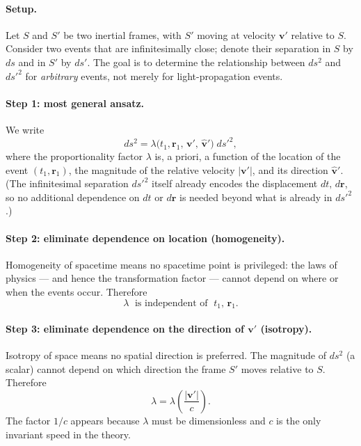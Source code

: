 \paragraph{Setup.}
Let $S$ and $S'$ be two inertial frames, with $S'$ moving at velocity
$\mathbf{v}'$ relative to $S$.  Consider two events that are
infinitesimally close; denote their separation in $S$ by $ds$ and in
$S'$ by $ds'$.  The goal is to determine the relationship between
$ds^2$ and $ds'^2$ for \emph{arbitrary} events, not merely for
light-propagation events.

\paragraph{Step 1: most general ansatz.}
We write
\begin{equation}
  ds^2 = \lambda\bigl(t_1, \mathbf{r}_1,\,\mathbf{v}',\,
         \widehat{\mathbf{v}}'\bigr)\;ds'^2,
  \label{eq:lec02:ansatz0}
\end{equation}
where the proportionality factor $\lambda$ is, a priori, a function
of the location of the event $(t_1,\mathbf{r}_1)$, the magnitude of
the relative velocity $|\mathbf{v}'|$, and its direction
$\widehat{\mathbf{v}}'$.  (The infinitesimal separation $ds'^2$
itself already encodes the displacement $dt,\,d\mathbf{r}$, so no
additional dependence on $dt$ or $d\mathbf{r}$ is needed beyond
what is already in $ds'^2$.)

\paragraph{Step 2: eliminate dependence on location (homogeneity).}
Homogeneity of spacetime means no spacetime point is privileged:
the laws of physics — and hence the transformation factor — cannot
depend on where or when the events occur.  Therefore
\begin{equation}
  \lambda \;\text{ is independent of }\; t_1,\,\mathbf{r}_1.
  \label{eq:lec02:drop_r1}
\end{equation}

\paragraph{Step 3: eliminate dependence on the direction of $\mathbf{v}'$
(isotropy).}
Isotropy of space means no spatial direction is preferred.  The
magnitude of $ds^2$ (a scalar) cannot depend on which direction the
frame $S'$ moves relative to $S$.  Therefore
\begin{equation}
  \lambda = \lambda\!\left(\frac{|\mathbf{v}'|}{c}\right).
  \label{eq:lec02:drop_dir}
\end{equation}
The factor $1/c$ appears because $\lambda$ must be dimensionless and
$c$ is the only invariant speed in the theory.

